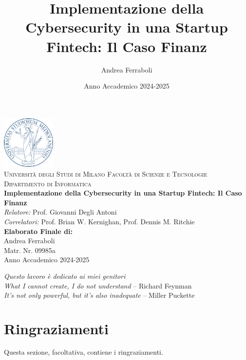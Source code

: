 \documentclass[a4paper,12pt]{book}
\title{Implementazione della Cybersecurity in una Startup Fintech: Il Caso Finanz}
\author{Andrea Ferraboli}
\date{Anno Accademico 2024-2025}
\begin{document}
\begin{titlepage}
    \begin{center}
        \includegraphics[width=0.2\textwidth]{images/Unimi-logo.png} \\[1cm]
        \textsc{\LARGE Università degli Studi di Milano}
        \textsc{\Large Facoltà di Scienze e Tecnologie}
        \vspace{0.5cm}
        \textsc{\Large Dipartimento di Informatica} \\
        \textbf{\huge Implementazione della Cybersecurity in una Startup Fintech: Il Caso Finanz} \\
        \vspace{1.5cm}
        \emph{Relatore:} Prof. Giovanni Degli Antoni \\
        \emph{Correlatori:} Prof. Brian W. Kernighan, Prof. Dennis M. Ritchie \\
        \vspace{2cm}
        \textbf{Elaborato Finale di:} \\
        Andrea Ferraboli \\
        Matr. Nr. 09985a \\
        \vfill
        Anno Accademico 2024-2025
    \end{center}
\end{titlepage}

\cleardoublepage
\thispagestyle{empty}
\begin{flushright}
    \emph{Questo lavoro è dedicato ai miei genitori}\\[1cm]
    \textit{\guillemotleft What I cannot create, I do not understand \guillemotright} -- Richard Feynman\\
    \textit{\guillemotleft It’s not only powerful, but it’s also inadequate \guillemotright} -- Miller Puckette
\end{flushright}

\chapter*{Ringraziamenti}
Questa sezione, facoltativa, contiene i ringraziamenti.
\end{document}
